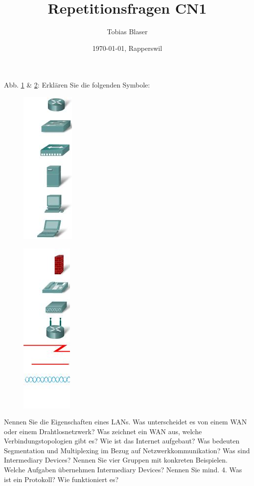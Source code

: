 \documentclass[ngerman,a4paper,12pt]{scrreprt}
\title{Repetitionsfragen CN1}
\author{Tobias Blaser}
\date{\today{}, Rapperswil}
\begin{document}
\tableofcontents
\clearpage


\ol
	\li Abb. \ref{symb1} \& \ref{symb2}: Erklären Sie die folgenden Symbole: 
		\begin{figure}[H]
			\caption{}
			\includegraphics[scale=0.60]{img/R1.1.jpg}
			\label{symb1}
		\end{figure}
		\begin{figure}[H]
			\caption{}
			\includegraphics[scale=0.60]{img/R1.2.jpg}
			\label{symb2}
		\end{figure}			 
	\li Nennen Sie die Eigenschaften eines LANs. Was unterscheidet es von einem WAN oder einem Drahtlosnetzwerk?
	\li Was zeichnet ein WAN aus, welche Verbindungstopologien gibt es?
	\li Wie ist das Internet aufgebaut?
	\li Was bedeuten Segmentation und Multiplexing im Bezug auf Netzwerkkommunikation?
	\li Was sind Intermediary Devices? Nennen Sie vier Gruppen mit konkreten Beispielen.
	\li Welche Aufgaben übernehmen Intermediary Devices? Nennen Sie mind. 4.
	\li Was ist ein Protokoll? Wie funktioniert es?
\end{document}
